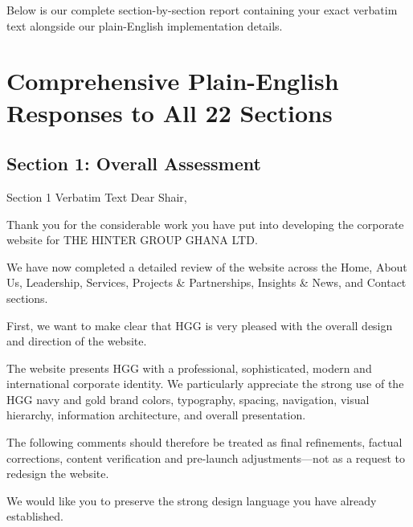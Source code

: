 \documentclass[11pt,a4paper]{article}
\begin{document}
\begin{ExecutiveSummaryBox}
Below is our complete section-by-section report containing your exact verbatim text alongside our plain-English implementation details.
\end{ExecutiveSummaryBox}

\vspace{0.3cm}

\section{Comprehensive Plain-English Responses to All 22 Sections}

\subsection{Section 1: Overall Assessment}

\begin{VerbatimClientBox}{Section 1 Verbatim Text}
Dear Shair,

Thank you for the considerable work you have put into developing the corporate website for THE HINTER GROUP GHANA LTD.

We have now completed a detailed review of the website across the Home, About Us, Leadership, Services, Projects \& Partnerships, Insights \& News, and Contact sections.

First, we want to make clear that HGG is very pleased with the overall design and direction of the website.

The website presents HGG with a professional, sophisticated, modern and international corporate identity. We particularly appreciate the strong use of the HGG navy and gold brand colors, typography, spacing, navigation, visual hierarchy, information architecture, and overall presentation.

The following comments should therefore be treated as final refinements, factual corrections, content verification and pre-launch adjustments---not as a request to redesign the website.

We would like you to preserve the strong design language you have already established.
\end{VerbatimClientBox}
\end{document}

